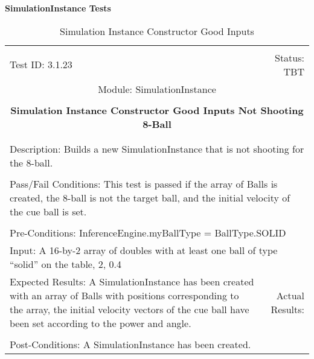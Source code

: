 \documentclass[titlepage]{article}
\begin{document}
\large{\textbf{SimulationInstance Tests}}
\begin{center}%
\begin{table}
\begin{tabular}{|l r|}\hline&\\[-2mm]
	Test ID: 3.1.23	&Status: TBT\\[-3mm]
	\multicolumn{2}{|c|}{Module: SimulationInstance}\\&\\
	\multicolumn{2}{|c|}{\textbf{\large{Simulation Instance Constructor Good Inputs Not Shooting 8-Ball}}}\\&\\\hline&\\[-3mm]
	\multicolumn{2}{|p{\textwidth}|}{Description: Builds a new SimulationInstance that is not shooting for the 8-ball.}\\[1mm]\hline&\\[-3mm]
	\multicolumn{2}{|p{\textwidth}|}{Pass/Fail Conditions: This test is passed if the array of Balls is created, the 8-ball is not the target ball, and the initial velocity of the cue ball is set.}\\[1mm]\hline&\\[-3mm]
	\multicolumn{2}{|p{\textwidth}|}{Pre-Conditions: InferenceEngine.myBallType = BallType.SOLID}\\[4mm]
	\multicolumn{2}{|p{\textwidth}|}{Input: A 16-by-2 array of doubles with at least one ball of type ``solid'' on the table, 2, 0.4}\\[2mm]\hline
	\multicolumn{1}{|p{0.49\textwidth}}{Expected Results: A SimulationInstance has been created with an array of Balls with positions corresponding to the array, the initial velocity vectors of the cue ball have been set according to the power and angle.}	&\multicolumn{1}{|p{0.45\textwidth}|}{Actual Results: }\\\hline&\\[-3mm]
	\multicolumn{2}{|p{\textwidth}|}{Post-Conditions: A SimulationInstance has been created.}\\\hline
\end{tabular}
\caption{Simulation Instance Constructor Good Inputs}
\end{table}
\end{center}
\end{document}
